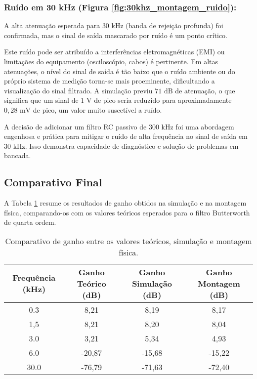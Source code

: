 \subsubsection{Ruído em 30 kHz (Figura \ref{fig:30khz_montagem_ruido}):}
A alta atenuação esperada para $30 \text{ kHz}$ (banda de rejeição profunda) foi confirmada, mas o sinal de saída mascarado por ruído é um ponto crítico.

Este ruído pode ser atribuído a interferências eletromagnéticas (EMI) ou limitações do equipamento (osciloscópio, cabos) é pertinente. Em altas atenuações, o nível do sinal de saída é tão baixo que o ruído ambiente ou do próprio sistema de medição torna-se mais proeminente, dificultando a visualização do sinal filtrado. A simulação previu $71 \text{ dB}$ de atenuação, o que significa que um sinal de $1 \text{ V}$ de pico seria reduzido para aproximadamente $0,28 \text{ mV}$ de pico, um valor muito suscetível a ruído.

A decisão de adicionar um filtro RC passivo de $300 \text{ kHz}$ foi uma abordagem engenhosa e prática para mitigar o ruído de alta frequência no sinal de saída em $30 \text{ kHz}$. Isso demonstra capacidade de diagnóstico e solução de problemas em bancada.

\subsection{Comparativo Final}

A Tabela \ref{tab:comparativo_resultados} resume os resultados de ganho obtidos na simulação e na montagem física, comparando-os com os valores teóricos esperados para o filtro Butterworth de quarta ordem.

\begin{table}[H]
\centering
\begin{tabular}{|c|c|c|c|}
\hline
\textbf{Frequência (kHz)} & \textbf{Ganho Teórico (dB)} & \textbf{Ganho Simulação (dB)} & \textbf{Ganho Montagem (dB)} \\
\hline
0.3 & 8,21 & 8,19 & 8,17 \\ \hline
1,5 & 8,21 & 8,20 & 8,04 \\ \hline
3.0 & 3,21 & 5,34 & 4,93 \\ \hline
6.0 & -20,87 & -15,68 & -15,22 \\ \hline
30.0 & -76,79 & -71,63 & -72,40 \\ \hline
\end{tabular}
\caption{Comparativo de ganho entre os valores teóricos, simulação e montagem física.}
\label{tab:comparativo_resultados}
\end{table}

